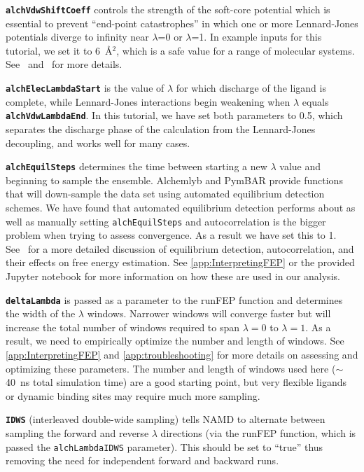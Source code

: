 \documentclass[9pt,tutorial]{Styling/livecoms}
\newcommand{\textInput}[1]{\texttt{#1}}
\begin{document}
\textbf{\textInput{alchVdwShiftCoeff}} controls the strength of the soft-core potential which is essential to prevent “end-point catastrophes” in which one or more Lennard-Jones potentials diverge to infinity near $\lambda$=0 or $\lambda$=1.
In example inputs for this tutorial, we set it to 6~\AA$^2$, which is a safe value for a range of molecular systems. See~\cite{Zacharias1994} and~\cite{Ebrahimi2022} for more details.

\textbf{\textInput{alchElecLambdaStart}} is the value of $\lambda$ for which discharge of the ligand is complete, while Lennard-Jones interactions begin weakening when $\lambda$ equals \textbf{\textInput{alchVdwLambdaEnd}}. 
In this tutorial, we have set both parameters to 0.5, which separates the discharge phase of the calculation from the Lennard-Jones decoupling, and works well for many cases. 

\textbf{\textInput{alchEquilSteps}} determines the time between starting a new $\lambda$ value and beginning to sample the ensemble. Alchemlyb and PymBAR provide functions that will down-sample the data set using automated equilibrium detection schemes. We have found that automated equilibrium detection performs about as well as manually setting \textInput{alchEquilSteps} and autocorrelation is the bigger problem when trying to assess convergence. As a result we have set this to 1. See~\cite{shirts2008statistically} for a more detailed discussion of equilibrium detection, autocorrelation, and their effects on free energy estimation. See \ref{app:InterpretingFEP} or the provided Jupyter notebook for more information on how these are used in our analysis.

\textbf{\textInput{deltaLambda}} is passed as a parameter to the runFEP function and determines the width of the $\lambda$ windows. Narrower windows will converge faster but will increase the total number of windows required to span $\lambda=0$ to $\lambda=1$. 
As a result, we need to empirically optimize the number and length of windows. 
See \ref{app:InterpretingFEP} and \ref{app:troubleshooting} for more details on assessing and optimizing these parameters. 
The number and length of windows used here ($\sim$ 40~ns total simulation time) are a good starting point, but very flexible ligands or dynamic binding sites may require much more sampling.   

\textbf{\textInput{IDWS}} (interleaved double-wide sampling) 
tells NAMD to alternate between sampling the forward and reverse $\lambda$ directions (via the runFEP function, which is passed the \textInput{alchLambdaIDWS} parameter). This should be set to ``true'' thus removing the need for independent forward and backward runs.
\end{document}
